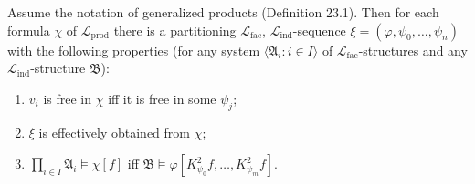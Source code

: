 Assume the notation of generalized products (Definition 23.1). Then for each formula $\chi$ of $\mathcal{L}_{\text{prod}}$ there is a partitioning $\mathcal{L}_{\text{fac}}$, $\mathcal{L}_{\text{ind}}$-sequence $\xi = (\varphi, \psi_0, \ldots, \psi_n)$ with the following properties (for any system $\langle \mathfrak{A}_i : i \in I \rangle$ of $\mathcal{L}_{\text{fac}}$-structures and any $\mathcal{L}_{\text{ind}}$-structure $\mathfrak{B}$):

\begin{enumerate}
\item[(i)] $v_i$ is free in $\chi$ iff it is free in some $\psi_j$;
\item[(ii)] $\xi$ is effectively obtained from $\chi$;
\item[(iii)] $\prod_{i \in I} \mathfrak{A}_i \models \chi[f]$ iff $\mathfrak{B} \models \varphi[K_{\psi_0}^2 f, \ldots, K_{\psi_m}^2 f]$.
\end{enumerate}
